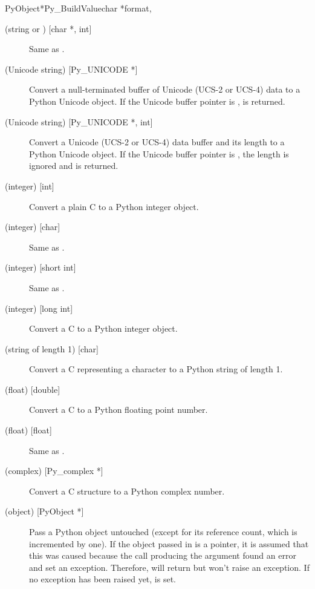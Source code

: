 \begin{cfuncdesc}{PyObject*}{Py_BuildValue}{char *format,
                                            \moreargs}
\begin{description}
    \item[ (string or ) {[char *, int]}]
    Same as .

    \item[ (Unicode string) {[Py_UNICODE *]}]
    Convert a null-terminated buffer of Unicode (UCS-2 or UCS-4) 
    data to a Python Unicode object.  If the Unicode buffer pointer 
    is \NULL,  is returned.

    \item[ (Unicode string) {[Py_UNICODE *, int]}]
    Convert a Unicode (UCS-2 or UCS-4) data buffer and its length 
    to a Python Unicode object.   If the Unicode buffer pointer 
    is \NULL, the length is ignored and  is returned.

    \item[ (integer) {[int]}]
    Convert a plain C  to a Python integer object.

    \item[ (integer) {[char]}]
    Same as .

    \item[ (integer) {[short int]}]
    Same as .

    \item[ (integer) {[long int]}]
    Convert a C  to a Python integer object.

    \item[ (string of length 1) {[char]}]
    Convert a C  representing a character to a Python
    string of length 1.

    \item[ (float) {[double]}]
    Convert a C  to a Python floating point number.

    \item[ (float) {[float]}]
    Same as .

    \item[ (complex) {[Py_complex *]}]
    Convert a C  structure to a Python complex
    number.

    \item[ (object) {[PyObject *]}]
    Pass a Python object untouched (except for its reference count,
    which is incremented by one).  If the object passed in is a
    \NULL{} pointer, it is assumed that this was caused because the
    call producing the argument found an error and set an exception.
    Therefore,  will return \NULL{} but
    won't raise an exception.  If no exception has been raised yet,
     is set.


\end{description}
\end{cfuncdesc}
